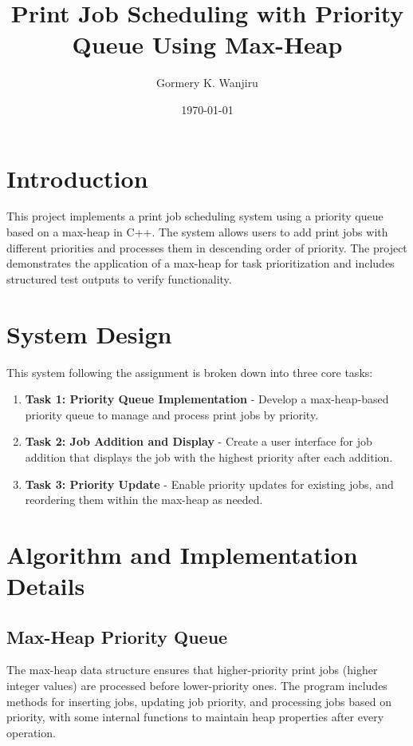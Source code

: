 \documentclass{article}
\title{Print Job Scheduling with Priority Queue Using Max-Heap}
\author{Gormery K. Wanjiru}
\date{\today}
\begin{document}
\maketitle

\section{Introduction}
This project implements a print job scheduling system using a priority queue based on a max-heap in C++. The system allows users to add print jobs with different priorities and processes them in descending order of priority. The project demonstrates the application of a max-heap for task prioritization and includes structured test outputs to verify functionality.

\section{System Design}
This system following the assignment is broken down into three core tasks:
\begin{enumerate}
    \item \textbf{Task 1: Priority Queue Implementation} - Develop a max-heap-based priority queue to manage and process print jobs by priority.
    \item \textbf{Task 2: Job Addition and Display} - Create a user interface for job addition that displays the job with the highest priority after each addition.
    \item \textbf{Task 3: Priority Update} - Enable priority updates for existing jobs, and reordering them within the max-heap as needed.
\end{enumerate}

\section{Algorithm and Implementation Details}

\subsection{Max-Heap Priority Queue}
The max-heap data structure ensures that higher-priority print jobs (higher integer values) are processed before lower-priority ones. The program includes methods for inserting jobs, updating job priority, and processing jobs based on priority, with some  internal functions to maintain heap properties after every operation.
\end{document}
